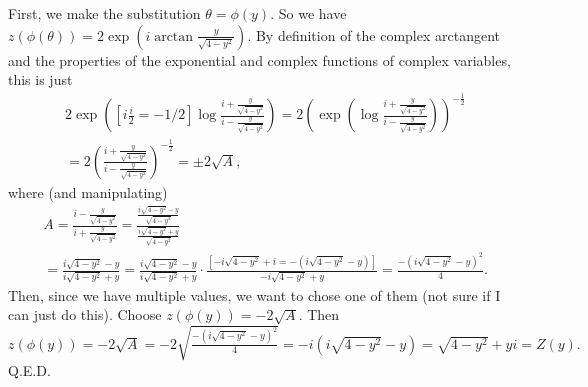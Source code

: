 \documentclass{article}
\theoremstyle{definition}
\begin{document}
 First, we make the substitution $\theta = \phi(y)$. So we have $z(\phi(\theta)) = 2\exp(i\arctan{\frac{y}{\sqrt{4-y^2}}}).$ By definition of the complex arctangent and the properties of the exponential and complex functions of complex variables, this is just 
$$\begin{array}{cc}
     & 2\exp\left(\left[i\frac{i}{2} = -1/2\right]\log{\frac{i+\frac{y}{\sqrt{4-y^2}}}{i-\frac{y}{\sqrt{4 - y^2}}}}\right) = 2\left(\exp\left(\log{\frac{i+\frac{y}{\sqrt{4-y^2}}}{i-\frac{y}{\sqrt{4-y^2}}}}\right) \right)^{-\frac{1}{2}}  \\
     & = 2\left(\frac{i+\frac{y}{\sqrt{4-y^2}}}{i-\frac{y}{\sqrt{4-y^2}}}\right)^{-\frac{1}{2}} = \pm2\sqrt{A},
\end{array} $$
where (and manipulating) $$\begin{array}{cc}
     & A =\frac{i-\frac{y}{\sqrt{4-y^2}}}{i+\frac{y}{\sqrt{4-y^2}}} = \frac{\frac{i\sqrt{4-y^2}-y}{\sqrt{4-y^2}}}{\frac{i\sqrt{4-y^2}+y}{\sqrt{4-y^2}}} \\
     & = \frac{i\sqrt{4-y^2}-y}{i\sqrt{4-y^2}+y} = \frac{i\sqrt{4-y^2}-y}{i\sqrt{4-y^2}+y}\cdot\frac{[-i\sqrt{4-y^2} + i = -(i\sqrt{4-y^2} - y)]}{-i\sqrt{4-y^2} + y} = \frac{-(i\sqrt{4-y^2} - y)^2}{4}.
\end{array}  $$
Then, since we have multiple values, we want to chose one of them (not sure if I can just do this). Choose $z(\phi(y)) = -2\sqrt{A}$. Then  $z(\phi(y)) = -2\sqrt{A} = -2\sqrt{\frac{-(i\sqrt{4-y^2} - y)^2}{4}} =  -i(i\sqrt{4-y^2}- y) = \sqrt{4-y^2}+yi = Z(y).$\\
Q.E.D.\\
\end{document}
